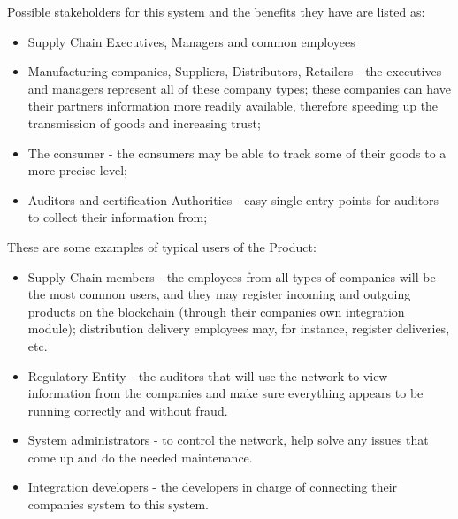 	 Possible stakeholders for this system and the benefits they have are listed as:
    \begin{itemize}
		\item Supply Chain Executives, Managers and common employees
			\item Manufacturing companies, Suppliers, Distributors, Retailers - the executives and managers represent all of these company types; these companies can have their partners information more readily available, therefore speeding up the transmission of goods and increasing trust;
		\item The consumer - the consumers may be able to track some of their goods to a more precise level;
		\item Auditors and certification Authorities - easy single entry points for auditors to collect their information from;
	\end{itemize}
	These are some examples of typical users of the Product:
	\begin{itemize}
		\item Supply Chain members - the employees from all types of companies will be the most common users, and they may register incoming and outgoing products on the blockchain (through their companies own integration module); distribution delivery employees may, for instance, register deliveries, etc.
		\item Regulatory Entity - the auditors that will use the network to view information from the companies and make sure everything appears to be running correctly and without fraud.
		\item System administrators - to control the network, help solve any issues that come up and do the needed maintenance.
		\item Integration developers - the developers in charge of connecting their companies system to this system.
	\end{itemize}

